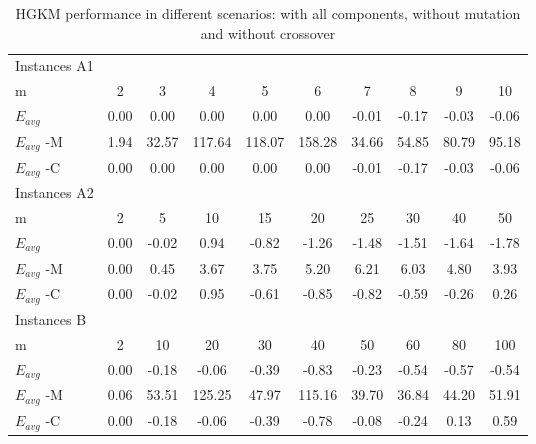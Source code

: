 \begin{table}[H]
{\small
\centering
\begin{tabular}{lccccccccc}
\hline
Instances A1 &      &       &        &        &        &       &       &       &       \\
m            & 2    & 3     & 4      & 5      & 6      & 7     & 8     & 9     & 10    \\
$E_{avg}$    & 0.00 & 0.00  & 0.00   & 0.00   & 0.00   & -0.01 & -0.17 & -0.03 & -0.06 \\
$E_{avg}$ -M & 1.94 & 32.57 & 117.64 & 118.07 & 158.28 & 34.66 & 54.85 & 80.79 & 95.18 \\
$E_{avg}$ -C & 0.00 & 0.00  & 0.00   & 0.00   & 0.00   & -0.01 & -0.17 & -0.03 & -0.06 \\ \hline
Instances A2 &      &       &        &        &        &       &       &       &       \\
m            & 2    & 5     & 10     & 15     & 20     & 25    & 30    & 40    & 50    \\
$E_{avg}$    & 0.00 & -0.02 & 0.94   & -0.82  & -1.26  & -1.48 & -1.51 & -1.64 & -1.78 \\
$E_{avg}$ -M & 0.00 & 0.45  & 3.67   & 3.75   & 5.20   & 6.21  & 6.03  & 4.80  & 3.93  \\
$E_{avg}$ -C & 0.00 & -0.02 & 0.95   & -0.61  & -0.85  & -0.82 & -0.59 & -0.26 & 0.26  \\ \hline
Instances B  &      &       &        &        &        &       &       &       &       \\
m            & 2    & 10    & 20     & 30     & 40     & 50    & 60    & 80    & 100   \\
$E_{avg}$    & 0.00 & -0.18 & -0.06  & -0.39  & -0.83  & -0.23 & -0.54 & -0.57 & -0.54 \\
$E_{avg}$ -M & 0.06 & 53.51 & 125.25 & 47.97  & 115.16 & 39.70 & 36.84 & 44.20 & 51.91 \\
$E_{avg}$ -C & 0.00 & -0.18 & -0.06  & -0.39  & -0.78  & -0.08 & -0.24 & 0.13  & 0.59  \\ \hline
\end{tabular}
\caption{HGKM performance in different scenarios: with all components, without mutation and without crossover}}
\label{components-table}
\end{table}